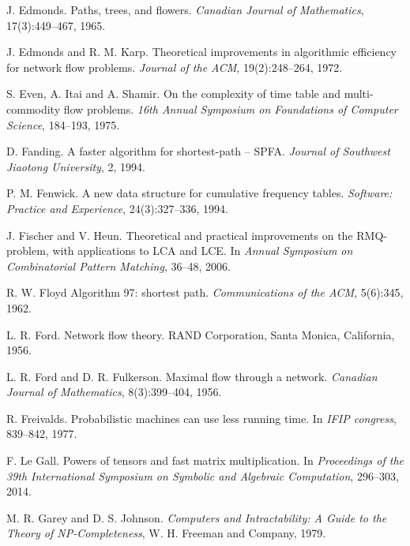 \begin{thebibliography}{9}


  J. Edmonds.
  Paths, trees, and flowers.
  \emph{Canadian Journal of Mathematics}, 17(3):449--467, 1965.

  J. Edmonds and R. M. Karp.
  Theoretical improvements in algorithmic efficiency for network flow problems.
  \emph{Journal of the ACM}, 19(2):248--264, 1972.

  S. Even, A. Itai and A. Shamir.
  On the complexity of time table and multi-commodity flow problems.
  \emph{16th Annual Symposium on Foundations of Computer Science}, 184--193, 1975.

  D. Fanding.
  A faster algorithm for shortest-path -- SPFA.
  \emph{Journal of Southwest Jiaotong University}, 2, 1994.

  P. M. Fenwick.
  A new data structure for cumulative frequency tables.
  \emph{Software: Practice and Experience}, 24(3):327--336, 1994.

  J. Fischer and V. Heun.
  Theoretical and practical improvements on the RMQ-problem, with applications to LCA and LCE.
  In \emph{Annual Symposium on Combinatorial Pattern Matching}, 36--48, 2006.

  R. W. Floyd
  Algorithm 97: shortest path.
  \emph{Communications of the ACM}, 5(6):345, 1962.

  L. R. Ford.
  Network flow theory.
  RAND Corporation, Santa Monica, California, 1956.

  L. R. Ford and D. R. Fulkerson.
  Maximal flow through a network.
  \emph{Canadian Journal of Mathematics}, 8(3):399--404, 1956.

  R. Freivalds.
  Probabilistic machines can use less running time.
  In \emph{IFIP congress}, 839--842, 1977.

  F. Le Gall.
  Powers of tensors and fast matrix multiplication.
  In \emph{Proceedings of the 39th International Symposium on Symbolic and Algebraic Computation},
  296--303, 2014.

  M. R. Garey and D. S. Johnson.
  \emph{Computers and Intractability:
  A Guide to the Theory of NP-Completeness},
  W. H. Freeman and Company, 1979.


\end{thebibliography}
